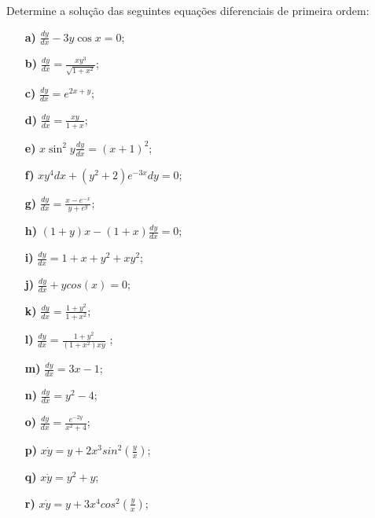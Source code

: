 \linespread{1.5}
Determine a solução das seguintes equações diferenciais de primeira ordem:
\begin{itemize}
    \item[\textbf{a)}] $\frac{dy}{dx} - 3y\cos{x} = 0$;
    \item[\textbf{b)}] $\frac{dy}{dx} = \frac{xy^3}{\sqrt{1+x^2}}$;
    \item[\textbf{c)}] $\frac{dy}{dx} = e^{2x+y}$;
    \item[\textbf{d)}] $\frac{dy}{dx} = \frac{xy}{1+x}$;
    \item[\textbf{e)}] $x\sin^2{y}\frac{dy}{dx} = (x+1)^2$;
    \item[\textbf{f)}] $xy^4dx + (y^2+2)e^{-3x}dy = 0$;
    \item[\textbf{g)}] $\frac{dy}{dx} = \frac{x-e^{-x}}{y+e^y}$;
    \item[\textbf{h)}] $(1+y)x - (1+x)\frac{dy}{dx} = 0$;
    \item[\textbf{i)}] $\frac{dy}{dx} = 1 + x + y^2 + xy^2$;
    \item[\textbf{j)}] $\frac{dy}{dx} + ycos(x) = 0$;
    \item[\textbf{k)}] $\frac{dy}{dx} = \frac{1 + y^2}{1+x^2}$;
    \item[\textbf{l)}] $\frac{dy}{dx} = \frac{1+y^2}{(1+x^2)xy}$ ;
    \item[\textbf{m)}] $\frac{dy}{dx} = 3x -1$;
    \item[\textbf{n)}] $\frac{dy}{dx} = y^2-4$;
    \item[\textbf{o)}] $\frac{dy}{dx} = \frac{e^{-2y}}{x^2+4}$;
    \item[\textbf{p)}] $x\dot{y} = y + 2x^3sin^2\left(\frac{y}{x}\right)$;
    \item[\textbf{q)}] $x\dot{y} = y^2 + y$;
    \item[\textbf{r)}] $x\dot{y} = y + 3x^4cos^2\left(\frac{y}{x}\right)$;
    
\end{itemize}